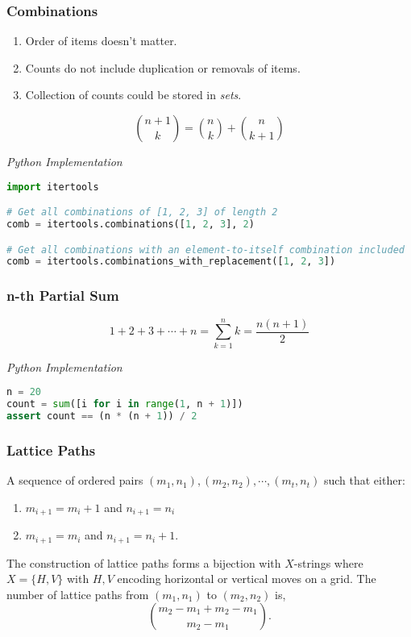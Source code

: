 \documentclass{article}
\begin{document}
    \subsubsection{Combinations}
    \begin{enumerate}
        \item Order of items doesn't matter. 
        \item Counts do not include duplication or removals of items.
        \item Collection of counts could be stored in \emph{sets}.
    \end{enumerate} 
    \[
        \binom{n+1}{k} = \binom{n}{k} + \binom{n}{k+1}
    \]

\vspace{8pt} \emph{Python Implementation}
\begin{lstlisting}[language=Python]
import itertools

# Get all combinations of [1, 2, 3] of length 2 
comb = itertools.combinations([1, 2, 3], 2)

# Get all combinations with an element-to-itself combination included 
comb = itertools.combinations_with_replacement([1, 2, 3])

\end{lstlisting}

    \subsubsection{n-th Partial Sum}
    \[
        1 +2 +3 + \cdots + n =  \sum_{k=1}^n k =  \frac{n(n+1)}{2} 
    \]
    
\vspace{8pt} \emph{Python Implementation}
\begin{lstlisting}[language=Python]
n = 20
count = sum([i for i in range(1, n + 1)])
assert count == (n * (n + 1)) / 2 
\end{lstlisting}

    \subsubsection{Lattice Paths}

    A sequence of ordered pairs $(m_1, n_1), (m_2, n_2), \cdots, (m_t, n_t)$ such that either:
    \begin{enumerate}
        \item $m_{i+1} = m_{i}+1$ and $n_{i+1} = n_{i}$
        \item $m_{i+1} = m_i$ and $n_{i+1} = n_i +1$.
    \end{enumerate}
    The construction of lattice paths forms a bijection with $X$-strings where $X = \{ H, V\}$ with $H,V$ encoding horizontal or vertical moves on a grid. The number of lattice paths from $(m_1, n_1)$ to $(m_2,n_2)$ is,
    \[
       \binom{m_2 - m_1 + m_2 - m_1}{m_2-m_1}.
    \]
\end{document}
